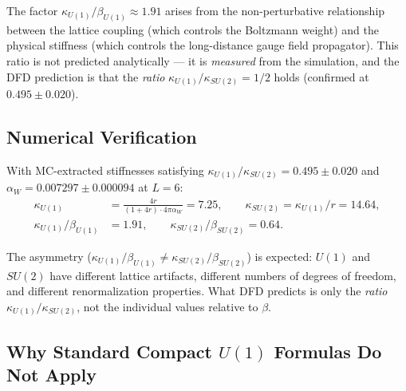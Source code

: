 \documentclass[12pt,a4paper]{article}
\newcommand{\bU}{\beta_{U(1)}}
\newcommand{\bS}{\beta_{SU(2)}}
\newcommand{\kU}{\kappa_{U(1)}}
\newcommand{\kS}{\kappa_{SU(2)}}
\newcommand{\aW}{\alpha_W}
\begin{document}
The factor $\kU/\bU \approx 1.91$ arises from the non-perturbative
relationship between the lattice coupling (which controls the Boltzmann
weight) and the physical stiffness (which controls the long-distance gauge
field propagator).  This ratio is not predicted analytically --- it is
\emph{measured} from the simulation, and the DFD prediction is that the
\emph{ratio} $\kU/\kS = 1/2$ holds (confirmed at $0.495 \pm 0.020$).

\subsection{Numerical Verification}

With MC-extracted stiffnesses satisfying $\kU/\kS = 0.495 \pm 0.020$ and
$\aW = 0.007297 \pm 0.000094$ at $L = 6$:
\begin{align}
  \kU &= \frac{4r}{(1+4r) \cdot 4\pi\aW} = 7.25, \qquad
  \kS = \kU/r = 14.64, \\
  \kU/\bU &= 1.91, \qquad
  \kS/\bS = 0.64.
\end{align}

The asymmetry ($\kU/\bU \neq \kS/\bS$) is expected: $U(1)$ and $SU(2)$
have different lattice artifacts, different numbers of degrees of freedom,
and different renormalization properties.  What DFD predicts is only the
\emph{ratio} $\kU/\kS$, not the individual values relative to $\beta$.

\subsection{Why Standard Compact $U(1)$ Formulas Do Not Apply}
\end{document}
